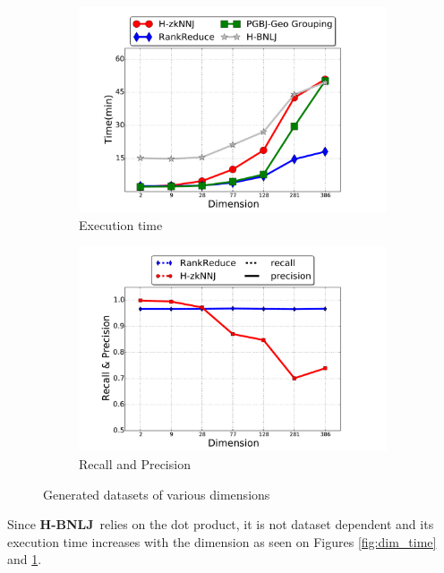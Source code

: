 \documentclass[10pt,journal,compsoc]{IEEEtran}
\newcommand{\HBNLJ}{{\bf H-BNLJ}}
\begin{document}
\begin{figure}[ht]
	\centering
	\begin{subfigure}[b]{0.5\textwidth}
		\includegraphics[width=1\textwidth]{randtime.pdf} 
		\caption{Execution time%
		}
		\label{fig:rand_time}
	\end{subfigure}\begin{subfigure}[b]{0.5\textwidth}
	
	\includegraphics[width=1\textwidth]{randacc.pdf} 
	\caption{Recall and Precision}
	\label{fig:rand_acc}
\end{subfigure}%
\caption{Generated datasets of various dimensions}
\label{fig:dim_rand}
\end{figure} 


Since \HBNLJ~relies on the dot product, it is not dataset dependent and its execution time increases
with the dimension as seen on Figures \ref{fig:dim_time} and \ref{fig:rand_time}. 
\end{document}
